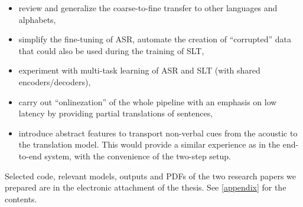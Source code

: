 \begin{itemize}
	\item review and generalize the coarse-to-fine transfer to other languages and alphabets,
	\item simplify the fine-tuning of ASR, automate the creation of ``corrupted'' data that could also be used during the training of SLT,
	\item experiment with multi-task learning of ASR and SLT (with shared encoders/decoders),
	\item carry out ``onlinezation'' of the whole pipeline with an emphasis on low latency by providing partial translations of sentences,
	\item introduce abstract features to transport non-verbal cues from the acoustic to the translation model. This would provide a similar experience as in the end-to-end system, with the convenience of the two-step setup.
\end{itemize}

Selected code, relevant models, outputs and PDFs of the two research papers we prepared are in the electronic attachment of the thesis. See \cref{appendix} for the contents.